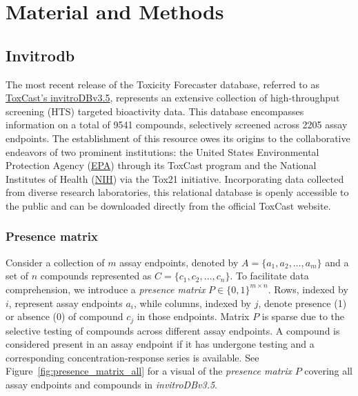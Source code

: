 \chapter{Material and Methods}
\section{Invitrodb}
The most recent release of the Toxicity Forecaster database, referred to as \href{https://cfpub.epa.gov/si/si_public_record_Report.cfm?dirEntryId=355484&Lab=CCTE}{ToxCast's invitroDBv3.5}, represents an extensive collection of high-throughput screening (HTS) targeted bioactivity data. This database encompasses information on a total of 9541 compounds, selectively screened across 2205 assay endpoints. The establishment of this resource owes its origins to the collaborative endeavors of two prominent institutions: the United States Environmental Protection Agency (\href{https://www.epa.gov/chemical-research/exploring-toxcast-data}{EPA}) through its ToxCast program and the National Institutes of Health (\href{https://ntp.niehs.nih.gov/whatwestudy/tox21}{NIH}) via the Tox21 initiative. Incorporating data collected from diverse research laboratories, this relational database is openly accessible to the public and can be downloaded directly from the official ToxCast website.




\subsection{Presence matrix}
Consider a collection of $m$ assay endpoints, denoted by $A = \{a_1, a_2, \dots, a_m\}$ and a set of $n$ compounds represented as $C = \{c_1, c_2, \dots, c_n\}$.
To facilitate data comprehension, we introduce a \emph{presence matrix} $P \in {\{0, 1\}}^{m \times n}$. Rows, indexed by $i$, represent assay endpoints $a_i$, while columns, indexed by $j$, denote presence (1) or absence (0) of compound $c_j$ in those endpoints. Matrix $P$ is sparse due to the selective testing of compounds across different assay endpoints. A compound is considered present in an assay endpoint if it has undergone testing and a corresponding concentration-response series is available.
See Figure~\ref{fig:presence_matrix_all} for a visual of the \emph{presence matrix} $P$ covering all assay endpoints and compounds in \textit{invitroDBv3.5}. 

